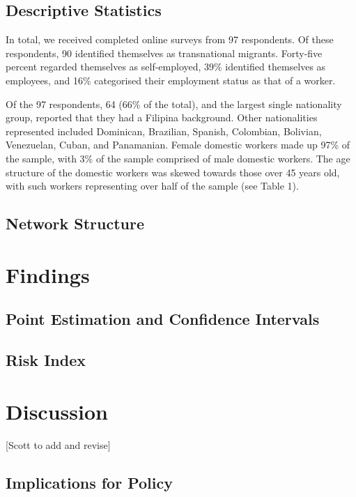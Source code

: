 \documentclass[
  12pt,
  letterpaper,
  DIV=11,
  numbers=noendperiod]{scrartcl}
\begin{document}
\subsection{Descriptive Statistics}\label{descriptive-statistics}

In total, we received completed online surveys from 97 respondents. Of
these respondents, 90 identified themselves as transnational migrants.
Forty-five percent regarded themselves as self-employed, 39\% identified
themselves as employees, and 16\% categorised their employment status as
that of a worker.

Of the 97 respondents, 64 (66\% of the total), and the largest single
nationality group, reported that they had a Filipina background. Other
nationalities represented included Dominican, Brazilian, Spanish,
Colombian, Bolivian, Venezuelan, Cuban, and Panamanian. Female domestic
workers made up 97\% of the sample, with 3\% of the sample comprised of
male domestic workers. The age structure of the domestic workers was
skewed towards those over 45 years old, with such workers representing
over half of the sample (see Table 1).

\subsection{Network Structure}\label{network-structure}

\section{Findings}\label{findings}

\subsection{Point Estimation and Confidence
Intervals}\label{point-estimation-and-confidence-intervals}

\subsection{Risk Index}\label{risk-index}

\section{Discussion}\label{discussion}

{[}Scott to add and revise{]}

\subsection{Implications for Policy}\label{implications-for-policy}
\end{document}
